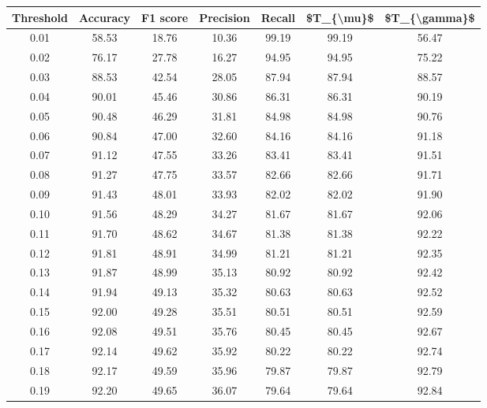 \begin{tabular}{|c|c|c|c|c|c|c|}
\toprule
 Threshold &  Accuracy &  F1 score &  Precision &  Recall &  \$T\_\{\textbackslash mu\}\$ &  \$T\_\{\textbackslash gamma\}\$ \\
\hline
      0.01 &     58.53 &     18.76 &      10.36 &   99.19 &      99.19 &         56.47 \\
      0.02 &     76.17 &     27.78 &      16.27 &   94.95 &      94.95 &         75.22 \\
      0.03 &     88.53 &     42.54 &      28.05 &   87.94 &      87.94 &         88.57 \\
      0.04 &     90.01 &     45.46 &      30.86 &   86.31 &      86.31 &         90.19 \\
      0.05 &     90.48 &     46.29 &      31.81 &   84.98 &      84.98 &         90.76 \\
      0.06 &     90.84 &     47.00 &      32.60 &   84.16 &      84.16 &         91.18 \\
      0.07 &     91.12 &     47.55 &      33.26 &   83.41 &      83.41 &         91.51 \\
      0.08 &     91.27 &     47.75 &      33.57 &   82.66 &      82.66 &         91.71 \\
      0.09 &     91.43 &     48.01 &      33.93 &   82.02 &      82.02 &         91.90 \\
      0.10 &     91.56 &     48.29 &      34.27 &   81.67 &      81.67 &         92.06 \\
      0.11 &     91.70 &     48.62 &      34.67 &   81.38 &      81.38 &         92.22 \\
      0.12 &     91.81 &     48.91 &      34.99 &   81.21 &      81.21 &         92.35 \\
      0.13 &     91.87 &     48.99 &      35.13 &   80.92 &      80.92 &         92.42 \\
      0.14 &     91.94 &     49.13 &      35.32 &   80.63 &      80.63 &         92.52 \\
      0.15 &     92.00 &     49.28 &      35.51 &   80.51 &      80.51 &         92.59 \\
      0.16 &     92.08 &     49.51 &      35.76 &   80.45 &      80.45 &         92.67 \\
      0.17 &     92.14 &     49.62 &      35.92 &   80.22 &      80.22 &         92.74 \\
      0.18 &     92.17 &     49.59 &      35.96 &   79.87 &      79.87 &         92.79 \\
      0.19 &     92.20 &     49.65 &      36.07 &   79.64 &      79.64 &         92.84 \\

\end{tabular}

